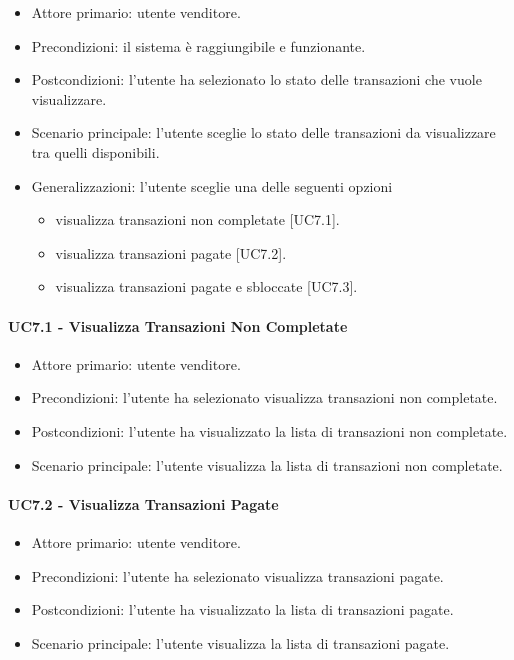 \begin{itemize}
    \item Attore primario: utente venditore.
    \item Precondizioni: il sistema è raggiungibile e funzionante.
    \item Postcondizioni: l'utente ha selezionato lo stato delle transazioni che vuole visualizzare.
    \item Scenario principale: l'utente sceglie lo stato delle transazioni da visualizzare tra quelli disponibili.
    \item Generalizzazioni: l'utente sceglie una delle seguenti opzioni\begin{itemize}
        \item visualizza transazioni non completate [UC7.1].
        \item visualizza transazioni pagate [UC7.2].
        \item visualizza transazioni pagate e sbloccate [UC7.3].
    \end{itemize}
\end{itemize}

\paragraph{UC7.1 - Visualizza Transazioni Non Completate}

\begin{itemize}
    \item Attore primario: utente venditore.
    \item Precondizioni: l'utente ha selezionato visualizza transazioni non completate.
    \item Postcondizioni: l'utente ha visualizzato la lista di transazioni non completate.
    \item Scenario principale: l'utente visualizza la lista di transazioni non completate.
\end{itemize}

\paragraph{UC7.2 - Visualizza Transazioni Pagate}

\begin{itemize}
    \item Attore primario: utente venditore.
    \item Precondizioni: l'utente ha selezionato visualizza transazioni pagate.
    \item Postcondizioni: l'utente ha visualizzato la lista di transazioni pagate.
    \item Scenario principale: l'utente visualizza la lista di transazioni pagate.
\end{itemize}

